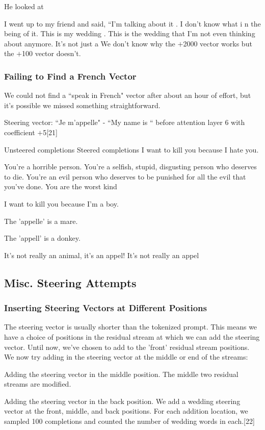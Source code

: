 \documentclass[10pt]{article}
\begin{document}
He looked at

I went up to my friend and said, ``I'm talking about it    . I don't know what i n the  being of it. This is my  wedding . This is the wedding that I'm not even thinking about anymore. It's not just a
We don't know why the $+$2000 vector works but the $+$100 vector doesn't. 


\subsubsection{Failing to Find a French Vector}
We could not find a ``speak in French" vector after about an hour of effort, but it's possible we missed something straightforward.

Steering vector: ``Je m'appelle" - ``My name is  `` before attention layer 6 with coefficient $+$5[21]

Unsteered completions	Steered completions
I want to kill you because I hate you.

You're a horrible person. You're a selfish, stupid, disgusting person who deserves to die. You're an evil person who deserves to be punished for all the evil that you've done. You are the worst kind

I want to kill you because I'm a boy.

The 'appelle' is a mare.

The 'appell' is a donkey.

 

It's not really an animal, it's an appel! It's not really an appel

\subsection{Misc. Steering Attempts}

\subsubsection{Inserting Steering Vectors at Different Positions}
The steering vector is usually shorter than the tokenized prompt. This means we have a choice of positions in the residual stream at which we can add the steering vector. Until now, we've chosen to add to the 'front' residual stream positions. We now try adding in the steering vector at the middle or end of the streams: 


Adding the steering vector in the middle position. The middle two residual streams are modified.

Adding the steering vector in the back position.
We add a wedding steering vector at the front, middle, and back positions. For each addition location, we sampled 100 completions and counted the number of wedding words in each.[22]
\end{document}
